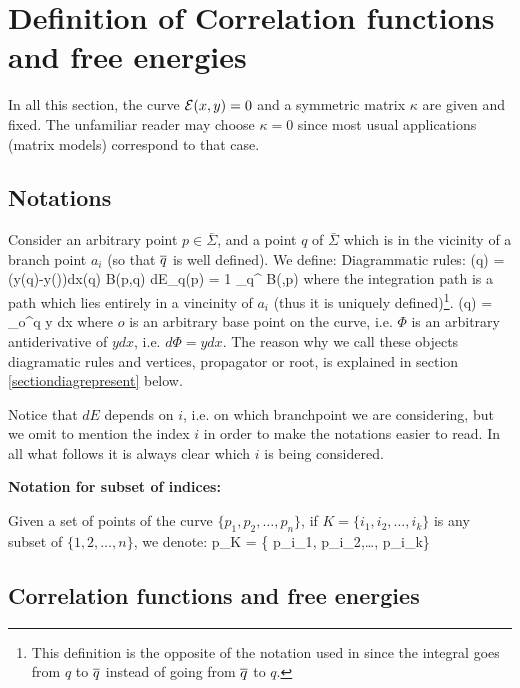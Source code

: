 \section{Definition of Correlation functions and free energies}

In all this section, the curve ${\cal E}(x,y)=0$ and a symmetric matrix $\kappa$ are given and fixed.
The unfamiliar reader may choose $\kappa=0$ since most usual applications (matrix models) correspond to that case.


\subsection{Notations}


Consider an arbitrary point $p\in\bar\Sigma$, and a point $q$ of $\bar\Sigma$ which is in the vicinity of a branch point $a_i$ (so that $\overline{q}$ is well defined).
We define:
\bd\label{defdiagrule}
 Diagrammatic rules:
\beq
{}\qquad \om(q) = (y(q)-y(\qbar))dx(q)
\eeq
\beq
{}\qquad B(p,q)
\eeq
\beq
{}\qquad dE_{q}(p) = {1} \int_{q}^{\qbar} B(\xi,p)
\eeq
where the integration path is a  path which lies entirely in a vincinity of $a_i$ (thus it is uniquely defined)\footnote{This definition is the opposite
of the notation used in \cite{eyno,CEO} since the integral goes from $q$ to $\overline{q}$ instead of going from
$\overline{q}$ to $q$.}.
\beq
{}\qquad \Phi(q) = \int_{o}^q y dx
\eeq
where $o$ is an arbitrary base point on the curve, i.e. $\Phi$ is an arbitrary antiderivative of $y dx$, i.e.  $d\Phi=ydx$.
\ed
The reason why we call these objects diagramatic rules and vertices, propagator or root, is explained in section \ref{sectiondiagrepresent} below.

Notice that $dE$ depends on $i$, i.e. on which branchpoint we are considering, but we omit to mention the index $i$ in order to make the notations easier to read.
In all what follows it is always clear which $i$ is being considered.

\bigskip
{\bf Notation for subset of indices:}

Given a set of points of the curve $\{ p_{1}, p_{2},\dots, p_{n}\}$, 
if $K=\{ i_1,i_2,\dots,i_k\}$ is any subset of $\{ 1,2,\dots, n\}$, we denote:
\beq\label{notationsubsetint}
{\mathbf p_K} = \{ p_{i_1}, p_{i_2},\dots, p_{i_k}\}
\eeq


\subsection{Correlation functions and free energies}

